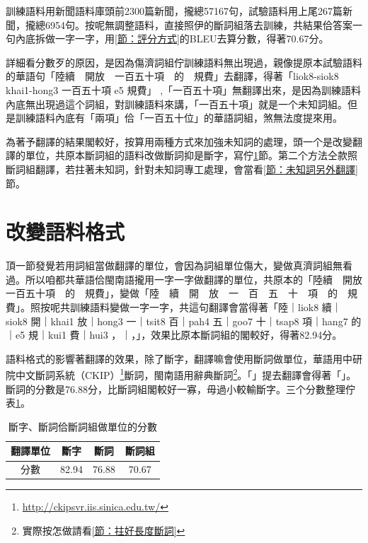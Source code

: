 \documentclass[final,oneside,onecolumn,12pt,a4paper]{book}%
\begin{document}
訓練語料用新聞語料庫頭前2300篇新聞，攏總57167句，試驗語料用上尾267篇新聞，攏總6954句。按呢無調整語料，直接照伊的斷詞組落去訓練，共結果佮答案一句內底拆做一字一字，用\ref{節：評分方式}的BLEU去算分數，得著70.67分。

詳細看分數歹的原因，是因為傷濟詞組佇訓練語料無出現過，親像提原本試驗語料的華語句「陸續　開放　一百五十項　的　規費」去翻譯，得著「liok8-siok8 khai1-hong3 一百五十項 e5 規費」 ,「一百五十項」無翻譯出來，是因為訓練語料內底無出現過這个詞組，對訓練語料來講，「一百五十項」就是一个未知詞組。但是訓練語料內底有「兩項」佮「一百五十位」的華語詞組，煞無法度提來用。

為著予翻譯的結果閣較好，按算用兩種方式來加強未知詞的處理，頭一个是改變翻譯的單位，共原本斷詞組的語料改做斷詞抑是斷字，寫佇\ref{節：改變語料格式}節。第二个方法仝款照斷詞組翻譯，若拄著未知詞，針對未知詞專工處理，會當看\ref{節：未知詞另外翻譯}節。



\section{改變語料格式}
\label{節：改變語料格式}

頂一節發覺若用詞組當做翻譯的單位，會因為詞組單位傷大，變做真濟詞組無看過。所以咱都共華語佮閩南語攏用一字一字做翻譯的單位，共原本的「陸續　開放　一百五十項　的　規費」，變做「陸　續　開　放　一　百　五　十　項　的　規　費」。照按呢共訓練語料變做一字一字，共這句翻譯會當得著「陸｜liok8 續｜siok8 開｜khai1 放｜hong3 一｜tsit8 百｜pah4 五｜goo7 十｜tsap8 項｜hang7 的｜e5 規｜kui1 費｜hui3 ，｜，」，效果比原本斷詞組的閣較好，得著82.94分。

語料格式的影響著翻譯的效果，除了斷字，翻譯嘛會使用斷詞做單位，華語用中研院中文斷詞系統（CKIP）\footnote{\url{http://ckipsvr.iis.sinica.edu.tw/}}斷詞，閩南語用辭典斷詞\footnote{實際按怎做請看\ref{節：拄好長度斷詞}}。「」提去翻譯會得著「」。斷詞的分數是76.88分，比斷詞組閣較好一寡，毋過小較輸斷字。三个分數整理佇表\ref{表：斷詞組、斷詞、斷字做單位的翻譯分數}。

\begin{table}
\caption{斷字、斷詞佮斷詞組做單位的分數}%
\label{表：斷詞組、斷詞、斷字做單位的翻譯分數}
\centering
\begin{tabular}{c|ccc}
翻譯單位 & 斷字 & 斷詞 & 斷詞組\\
\hline
分數　& 82.94 & 76.88 & 70.67\\
\end{tabular}
\end{table}
\end{document}
